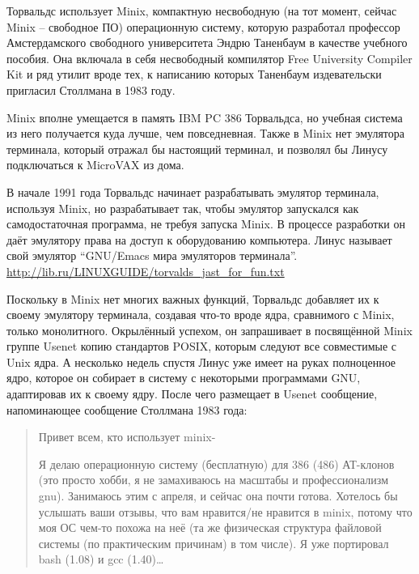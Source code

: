 Торвальдс использует Minix, компактную несвободную (на тот момент, сейчас Minix -- свободное ПО) операционную систему, которую разработал профессор Амстердамского свободного университета Эндрю Таненбаум в качестве учебного пособия. Она включала в себя несвободный компилятор Free University Compiler Kit и ряд утилит вроде тех, к написанию которых Таненбаум издевательски пригласил Столлмана в 1983 году. 

Minix вполне умещается в память IBM PC 386 Торвальдса, но учебная система из него получается куда лучше, чем повседневная. Также в Minix нет эмулятора терминала, который отражал бы настоящий терминал, и позволял бы Линусу подключаться к MicroVAX из дома.

В начале 1991 года Торвальдс начинает разрабатывать эмулятор терминала, используя Minix, но разрабатывает так, чтобы эмулятор запускался как самодостаточная программа, не требуя запуска Minix. В процессе разработки он даёт эмулятору права на доступ к оборудованию компьютера. Линус называет свой эмулятор \enquote{GNU/Emacs мира эмуляторов терминала}.  \url{http://lib.ru/LINUXGUIDE/torvalds_jast_for_fun.txt}

Поскольку в Minix нет многих важных функций, Торвальдс добавляет их к своему эмулятору терминала, создавая что-то вроде ядра, сравнимого с Minix, только монолитного. Окрылённый успехом, он запрашивает в посвящённой Minix группе Usenet копию стандартов POSIX, которым следуют все совместимые с Unix ядра. А несколько недель спустя Линус уже имеет на руках полноценное ядро, которое он собирает в систему с некоторыми программами GNU, адаптировав их к своему ядру. После чего размещает в Usenet сообщение, напоминающее сообщение Столлмана 1983 года:

\begin{quote}
Привет всем, кто использует minix-

Я делаю операционную систему (бесплатную) для 386 (486) АТ-клонов (это просто хобби, я не замахиваюсь на масштабы и профессионализм gnu). Занимаюсь этим с апреля, и сейчас она почти готова. Хотелось бы услышать ваши отзывы, что вам нравится/не нравится в minix, потому что моя ОС чем-то похожа на неё (та же физическая структура файловой системы (по практическим причинам) в том числе). Я уже портировал bash (1.08) и gcc (1.40)\ldots{}
\end{quote}

